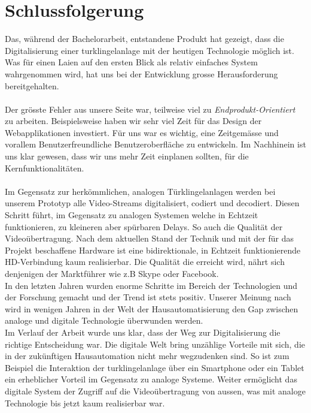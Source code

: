 \newpage

\section{Schlussfolgerung}
\label{sec:schlussfolgerung}
Das, während der Bachelorarbeit, entstandene Produkt hat gezeigt, dass die Digitalisierung einer \gls{turklingelanlage} mit der heutigen Technologie möglich ist. Was für einen Laien auf den ersten Blick als relativ einfaches System wahrgenommen wird, hat uns bei der Entwicklung grosse Herausforderung bereitgehalten. 
\\
\\
Der grösste Fehler aus unsere Seite war, teilweise viel zu \textit{Endprodukt-Orientiert} zu arbeiten. Beispielsweise haben wir sehr viel Zeit für das Design der Webapplikationen investiert. Für uns war es wichtig, eine Zeitgemässe und vorallem Benutzerfreundliche Benutzeroberfläche zu entwickeln. Im Nachhinein ist uns klar gewesen, dass wir uns mehr Zeit einplanen sollten, für die Kernfunktionalitäten. 
\\
\\
Im Gegensatz zur herkömmlichen, analogen Türklingelanlagen werden bei unserem Prototyp alle Video-Streams digitalisiert, codiert und decodiert. Diesen Schritt führt, im Gegensatz zu analogen Systemen welche in Echtzeit funktionieren, zu kleineren aber spürbaren Delays. So auch die Qualität der Videoübertragung. Nach dem aktuellen Stand der Technik und mit der für das Projekt beschaffene Hardware ist eine bidirektionale, in Echtzeit funktionierende HD-Verbindung kaum realisierbar. Die Qualität die erreicht wird, nährt sich denjenigen der Marktführer wie z.B Skype oder Facebook.
\\
In den letzten Jahren wurden enorme Schritte im Bereich der Technologien und der Forschung gemacht und der Trend ist stets positiv. Unserer Meinung nach wird in wenigen Jahren in der Welt der Hausautomatisierung den Gap zwischen analoge und digitale Technologie überwunden werden.
\\
Im Verlauf der Arbeit wurde uns klar, dass der Weg zur Digitalisierung die richtige Entscheidung war. Die digitale Welt bring unzählige Vorteile mit sich, die in der zukünftigen Hausautomation nicht mehr wegzudenken sind. So ist zum Beispiel die Interaktion der \gls{turklingelanlage} über ein Smartphone oder ein Tablet ein erheblicher Vorteil im Gegensatz zu analoge Systeme. Weiter ermöglicht das digitale System der Zugriff auf die Videoübertragung von aussen, was mit analoge Technologie bis jetzt kaum realisierbar war.
\\
\newpage

  
